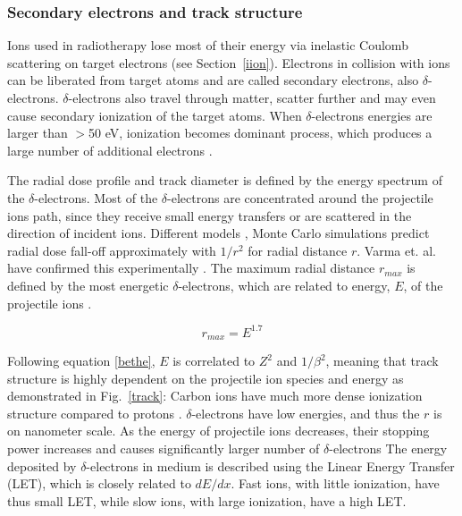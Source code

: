 \documentclass[type=dr, dr=rernat, accentcolor=tud7b,colorbacktitle, bigchapter, openright, twoside, 12pt ]{tudthesis}
\begin{document}
\subsubsection{Secondary electrons and track structure}

Ions used in radiotherapy lose most of their energy via inelastic Coulomb scattering on target electrons (see Section~\ref{iion}). Electrons in collision with ions can be liberated from target atoms and are called secondary electrons, also $\delta$-electrons. $\delta$-electrons also travel through matter, scatter further and may even cause secondary ionization of the target atoms. When $\delta$-electrons energies are larger than $>$50 eV,
ionization becomes dominant process, which produces a large number of additional electrons \cite{Kraft2000,Schardt2010}.

The radial dose profile and track diameter is defined by the energy spectrum of the $\delta$-electrons. Most of the $\delta$-electrons are concentrated around the projectile ions path, since they receive small energy transfers 
or are scattered in the direction of incident ions. Different models \cite{Chatterjee1976,Katz1999}, Monte Carlo simulations \cite{Paretzke1986,Kraemer1995} predict radial dose fall-off approximately with $1/r^2$ for radial distance $r$. Varma et. al. have confirmed 
this experimentally \cite{Varma1977}. The maximum radial distance $r_{max}$ is defined by the most energetic $\delta$-electrons, which are related to energy, $E$, of the projectile ions \cite{Kiefer1986}.

\begin{equation}
 r_{max} = E^{1.7}
\end{equation}

Following equation \ref{bethe}, $E$ is correlated to $Z^2$ and $1/\beta^2$, meaning that track structure is highly dependent on the projectile ion species and energy as demonstrated in Fig.~\ref{track}:
Carbon ions have much more dense ionization structure compared to protons \cite{!!}. $\delta$-electrons have low energies, and thus the $r$ is on nanometer scale. As the energy of projectile ions decreases, their
stopping power increases and causes significantly larger number of $\delta$-electrons The energy deposited by $\delta$-electrons in medium is described using the Linear Energy Transfer (LET), which is closely related to 
$dE/dx$. Fast ions, with little ionization, have thus small LET, while slow ions, with large ionization, have a high LET.

\newpage
\end{document}
